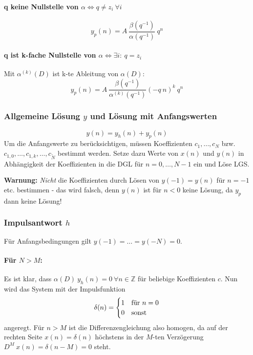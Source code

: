 \documentclass[10pt,a4paper]{article}
\begin{document}
\paragraph{q keine Nullstelle von $\alpha \Leftrightarrow q \neq z_i ~ \forall i$}
\[
	y_p(n) = A ~ \frac{\beta(q^{-1})}{\alpha(q^{-1})} ~ q^n
\]
\paragraph{q ist k-fache Nullstelle von $\alpha \Leftrightarrow \exists i: ~ q = z_i$} Mit $\alpha^{(k)}(D)$ ist k-te Ableitung von $\alpha(D)$:
\[
	y_p(n) = A ~ \frac{\beta(q^{-1})}{\alpha^{(k)}(q^{-1})} (-q ~ n)^k ~ q^n
\]

\subsubsection*{Allgemeine Lösung $y$ und Lösung mit Anfangswerten}
\[
	y(n) = y_h(n) + y_p(n)
\]
Um die Anfangswerte zu berücksichtigen, müssen Koeffizienten $c_1, …, c_N$ bzw. $c_{1,0}, …, c_{1,k}, …, c_{\tilde N}$ bestimmt werden. Setze dazu Werte von $x(n)$ und $y(n)$ in Abhängigkeit der Koeffizienten in die DGL für $n = 0, …, N - 1$ ein und Löse LGS.

\vspace{.5em}
\raggedright
\textbf{Warnung:} \textit{Nicht} die Koeffizienten durch Lösen von $y(-1) = y(n)$ für $n = -1$ etc. bestimmen - das wird falsch, denn $y(n)$ ist für $n < 0$ keine Lösung, da $y_p$ dann keine Lösung!

\subsubsection*{Impulsantwort $h$}
Für Anfangsbedingungen gilt $y(-1) = … = y(-N) = 0$.
\paragraph{Für $N > M$:} Es ist klar, dass $\alpha(D) ~ y_h(n) = 0 ~ \forall n \in \mathbb Z$ für beliebige Koeffizienten $c$. Nun wird das System mit der Impulsfunktion 
\[
	\delta(n) =
	\begin{cases}
		1 & \textnormal{für } n = 0 \\
		0 & \textnormal{sonst}
	\end{cases}
\]
angeregt. Für $n > M$ ist die Differenzengleichung also homogen, da auf der rechten Seite $x(n) = \delta(n)$ höchstens in der $M$-ten Verzögerung $D^M ~ x(n) = \delta(n - M) = 0$ steht.
\end{document}
